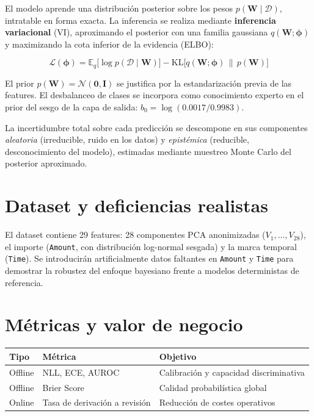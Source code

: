 \documentclass[11pt, a4paper]{article}
\begin{document}
El modelo aprende una distribución posterior sobre los pesos $p(\mathbf{W} \mid \mathcal{D})$, intratable en forma exacta. La inferencia se realiza mediante \textbf{inferencia variacional} (VI), aproximando el posterior con una familia gaussiana $q(\mathbf{W}; \boldsymbol{\phi})$ y maximizando la cota inferior de la evidencia (ELBO):

\begin{equation}
    \mathcal{L}(\boldsymbol{\phi}) = \mathbb{E}_{q}\bigl[\log p(\mathcal{D} \mid \mathbf{W})\bigr] - \mathrm{KL}\bigl[q(\mathbf{W};\boldsymbol{\phi}) \,\|\, p(\mathbf{W})\bigr]
\end{equation}

El prior $p(\mathbf{W}) = \mathcal{N}(\mathbf{0}, \mathbf{I})$ se justifica por la estandarización previa de las features. El desbalanceo de clases se incorpora como conocimiento experto en el prior del sesgo de la capa de salida: $b_0 = \log(0.0017 / 0.9983)$.

La incertidumbre total sobre cada predicción se descompone en sus componentes \textit{aleatoria} (irreducible, ruido en los datos) y \textit{epistémica} (reducible, desconocimiento del modelo), estimadas mediante muestreo Monte Carlo del posterior aproximado.

\section{Dataset y deficiencias realistas}

El dataset contiene 29 features: 28 componentes PCA anonimizadas ($V_1, \ldots, V_{28}$), el importe (\texttt{Amount}, con distribución log-normal sesgada) y la marca temporal (\texttt{Time}). Se introducirán artificialmente datos faltantes en \texttt{Amount} y \texttt{Time} para demostrar la robustez del enfoque bayesiano frente a modelos deterministas de referencia.

\section{Métricas y valor de negocio}

\begin{tabular}{@{}lll@{}}
    \toprule
    \textbf{Tipo} & \textbf{Métrica}              & \textbf{Objetivo}                      \\
    \midrule
    Offline       & NLL, ECE, AUROC               & Calibración y capacidad discriminativa \\
    Offline       & Brier Score                   & Calidad probabilística global          \\
    Online        & Tasa de derivación a revisión & Reducción de costes operativos         \\
    \bottomrule
\end{tabular}
\end{document}
